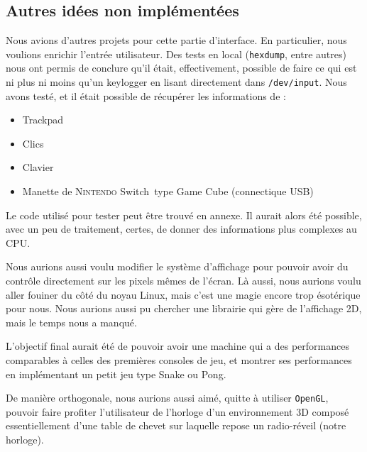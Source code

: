 \documentclass[10pt,a4paper,notitlepage ]{report}
\begin{document}
	\subsection{Autres idées non implémentées}
	
	Nous avions d'autres projets pour cette partie d'interface. En particulier, nous voulions enrichir l'entrée utilisateur. Des tests en local (\texttt{hexdump}, entre autres) nous ont permis de conclure qu'il était, effectivement, possible de faire ce qui est ni plus ni moins qu'un keylogger en lisant directement dans \texttt{/dev/input}. Nous avons testé, et il était possible de récupérer les informations de :
	\begin{itemize}
		\item Trackpad
		\item Clics
		\item Clavier
		\item Manette de \textsc{Nintendo} Switch\texttrademark\ type Game Cube (connectique USB)
	\end{itemize}
	
	Le code utilisé pour tester peut être trouvé en annexe.
	Il aurait alors été possible, avec un peu de traitement, certes, de donner des informations plus complexes au CPU. 
	
	Nous aurions aussi voulu modifier le système d'affichage pour pouvoir avoir du contrôle directement sur les pixels mêmes de l'écran. Là aussi, nous aurions voulu aller fouiner du côté du noyau Linux, mais c'est une magie encore trop ésotérique pour nous. Nous aurions aussi pu chercher une librairie qui gère de l'affichage 2D, mais le temps nous a manqué.
	
	L'objectif final aurait été de pouvoir avoir une machine qui a des performances comparables à celles des premières consoles de jeu, et montrer ses performances en implémentant un petit jeu type Snake ou Pong.
	
	De manière orthogonale, nous aurions aussi aimé, quitte à utiliser \texttt{OpenGL}, pouvoir faire profiter l'utilisateur de l'horloge d'un environnement 3D composé essentiellement d'une table de chevet sur laquelle repose un radio-réveil (notre horloge).
	
\end{document}
